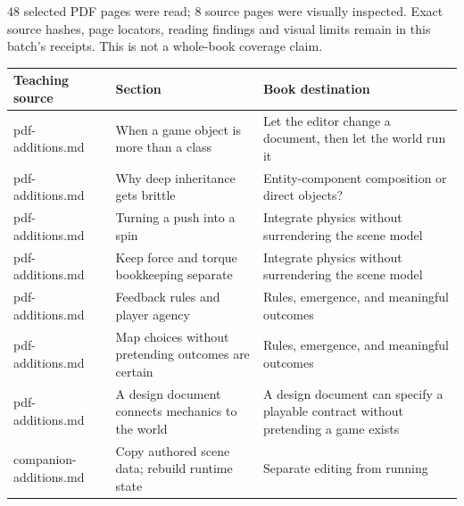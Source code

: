 48 selected PDF pages were read; 8 source pages were visually inspected. Exact source hashes, page locators, reading findings and visual limits remain in this batch's receipts. This is not a whole-book coverage claim.

{\def\LTcaptype{none} %
\begin{longtable}[]{@{}
  >{\raggedright\arraybackslash}p{}
  >{\raggedright\arraybackslash}p{}
  >{\raggedright\arraybackslash}p{}@{}}
\toprule\noalign{}
\begin{minipage}[b]{\linewidth}\raggedright
Teaching source
\end{minipage} & \begin{minipage}[b]{\linewidth}\raggedright
Section
\end{minipage} & \begin{minipage}[b]{\linewidth}\raggedright
Book destination
\end{minipage} \\
\midrule\noalign{}
\endhead
\bottomrule\noalign{}
\endlastfoot
pdf-additions.md & When a game object is more than a class & Let the editor change a document, then let the world run it \\
pdf-additions.md & Why deep inheritance gets brittle & Entity-component composition or direct objects? \\
pdf-additions.md & Turning a push into a spin & Integrate physics without surrendering the scene model \\
pdf-additions.md & Keep force and torque bookkeeping separate & Integrate physics without surrendering the scene model \\
pdf-additions.md & Feedback rules and player agency & Rules, emergence, and meaningful outcomes \\
pdf-additions.md & Map choices without pretending outcomes are certain & Rules, emergence, and meaningful outcomes \\
pdf-additions.md & A design document connects mechanics to the world & A design document can specify a playable contract without pretending a game exists \\
companion-additions.md & Copy authored scene data; rebuild runtime state & Separate editing from running \\
\end{longtable}
}

